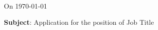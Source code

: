\documentclass[10pt, a4paper]{article}
\begin{document}
    \initdocument
    
    
    
    
    On \today
    
    \textbf{Subject}: Application for the position of Job Title
    
    
    
\end{document}
